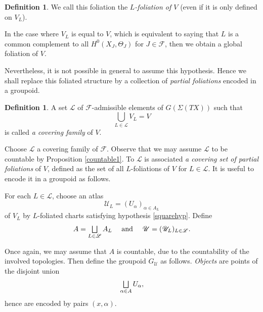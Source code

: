 \documentclass[JEP,XML,SOM,Unicode]{cedram}
\let\mathcal\mathscr
\let\oldbigsqcup\bigsqcup
\renewcommand{\bigsqcup}{\mathop{\textstyle\oldbigsqcup}\displaylimits}
\theoremstyle{plain}
\theoremstyle{definition}
\newtheorem{definition}[theorem]{Definition}
\theoremstyle{remark}
\numberwithin{equation}{section}
\let\uniondisjointe\bigsqcup
\begin{document}
\begin{definition}
\label{Lfoliation}
We call this foliation the \emph{$L$-foliation of $V$} (even if it is only defined on $V_L$).
\end{definition}

In the case where $V_L$ is equal to $V$, which is equivalent to saying that $L$ is a common complement to all $H^0(X_J,\Theta_J)$ for $J\in \mathcal F$, then we obtain a global foliation of $V$.

Nevertheless, it is not possible in general to assume this hypothesis. Hence we shall replace this foliated structure by a collection of \emph{partial foliations} encoded in a groupoid.
\begin{definition}
\label{coveringfamily}
A set $\mathcal L$ of $\mathcal F$-admissible elements of $G(\Sigma (TX))$ such that
\begin{equation}
\label{CF}
\bigcup_{L\in\mathcal L} V_L=V
\end{equation}
is called \emph{a covering family} of $V$.
\end{definition}

Choose $\mathcal L$ a covering family of $\mathcal F$. Observe that we may assume $\mathcal L$ to be countable by Proposition \ref{countable1}. To $\mathcal L$ is associated \emph{a covering set of partial foliations} of $V$, defined as the set of all $L$-foliations of $V$ for $L\in\mathcal L$. It is useful to encode it in a groupoid as follows.

For each $L\in\mathcal L$, choose an atlas
\begin{equation}
\label{atlas1}
\mathcal U_L=(U_{\alpha})_{\alpha\in A_L}
\end{equation}
of $V_L$ by $L$-foliated charts satisfying hypothesis \ref{squarehyp}. Define
\begin{equation}
\label{A}
A=\uniondisjointe_{L\in\mathcal L}A_L\quad\text{ and }\quad \mathcal U=(\mathcal U_L)_{L\in\mathcal L}.
\end{equation}

Once again, we may assume that $A$ is countable, due to the countability of the involved topologies. Then define the groupoid $G_{\mathcal U}$ as follows.
\emph{Objects} are points of the disjoint union
\begin{equation}
\label{objects}
\uniondisjointe _{\alpha\in A} U_{\alpha},
\end{equation}
hence are encoded by pairs $(x,\alpha)$.
\end{document}
